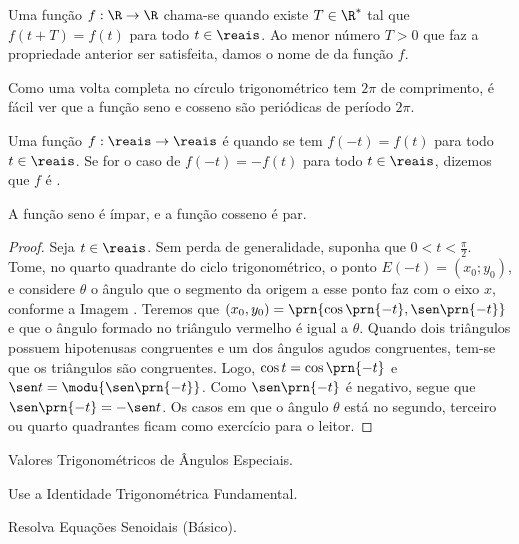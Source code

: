 \begin{definition}
    Uma função $f: \R \to \R$ chama-se  quando existe $T
\in \R^\ast$ tal que $f(t + T) = f(t)$ para todo $t \in \reais$. Ao
menor número $T>0$ que faz a propriedade anterior ser satisfeita,
damos o nome de  da função $f$.
\end{definition}

\begin{remark}
    Como uma volta completa no círculo trigonométrico tem $2 \pi$ de
comprimento, é fácil ver que a função seno e cosseno são periódicas
de período $2\pi$.
\end{remark}

\begin{definition}
\label{def:funcao-par-impar}
    Uma função $f: \reais \to \reais$ é  quando se tem $f(-t) = f(t)$
para todo $t\in \reais$. Se for o caso de $f(-t) = - f(t)$ para todo $t
\in \reais$, dizemos que $f$ é .
\end{definition}

 \begin{proposition}
     A função seno é ímpar, e a função cosseno é par.
 \end{proposition}

\begin{proof}
    Seja $t \in \reais$. Sem perda de generalidade, suponha que $0 < t < \frac \pi 2$.
    Tome, no quarto quadrante do ciclo trigonométrico, o ponto $E(-t) = (x_0; y_0)$, e considere 
    $\theta$ o ângulo que o segmento da origem a esse ponto faz com o eixo $x$, conforme a Imagem . %
    Teremos que $(x_0, y_0) =\prn{\cos\prn{-t}, \sen\prn{-t}}$ e que o ângulo formado no triângulo vermelho é igual a $\theta$.
    Quando dois triângulos possuem hipotenusas congruentes e um dos ângulos agudos congruentes, tem-se que os triângulos são congruentes.
    Logo, $\cos t = \cos\prn{-t}$ e $\sen t = \modu{\sen\prn{- t}}$. Como $\sen\prn{-t}$ é negativo, segue que 
    $\sen\prn{-t} = -\sen t$. Os casos em que o ângulo $\theta$ está no segundo, terceiro ou quarto quadrantes ficam como exercício 
    para o leitor.
\end{proof}

\begin{onlineact}
    {Valores Trigonométricos de Ângulos Especiais}.
\end{onlineact}

\begin{onlineact}
    {Use a Identidade Trigonométrica Fundamental}.
\end{onlineact}

\begin{onlineact}
    {Resolva Equações Senoidais (Básico)}.
\end{onlineact}
